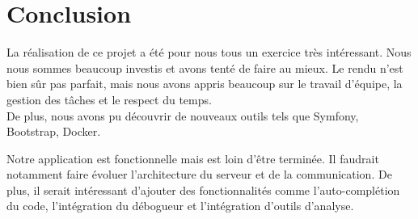 \chapter{Conclusion}

\par La réalisation de ce projet a été pour nous tous un exercice très intéressant. Nous nous sommes beaucoup investis et avons tenté de faire au mieux. Le rendu n'est bien sûr pas parfait, mais nous avons appris beaucoup sur le travail d'équipe, la gestion des tâches et le respect du temps.\\
De plus, nous avons pu découvrir de nouveaux outils tels que Symfony, Bootstrap, Docker. \\

\par Notre application est fonctionnelle mais est loin d'être terminée. Il faudrait notamment faire évoluer l'architecture du serveur et de la communication. De plus, il serait intéressant d'ajouter des fonctionnalités comme l'auto-complétion du code, l’intégration du débogueur et l'intégration d’outils d’analyse.